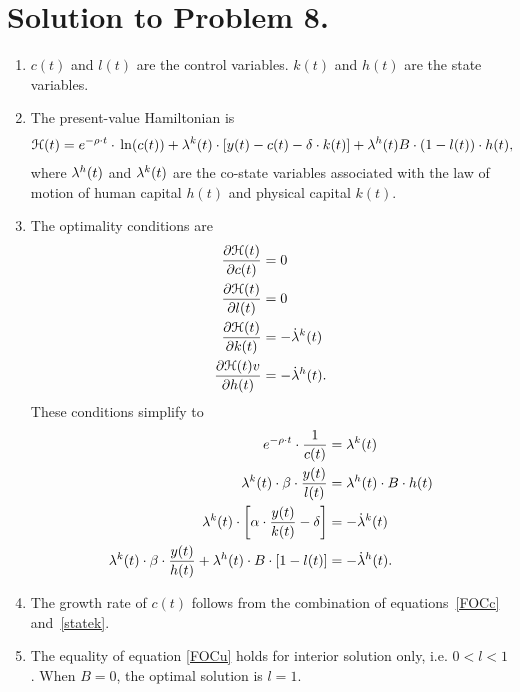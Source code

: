 \documentclass[letterpaper,12pt,leqno]{article}
\begin{document}
\section*{Solution to Problem 8.}
\begin{enumerate}
\item $c(t)$ and $l(t)$ are the control variables. $k(t)$ and $h(t)$ are the state variables.
\item The present-value Hamiltonian is
\begin{align*}
\Hc(t)=e^{-\rho \cdot t}\cdot \ln{c(t)} +\l^{k}(t)\cdot \bs{y(t)-c(t)-\d\cdot  k(t)} +\l^{h}(t) B\cdot \bp{1-l(t)}\cdot  h(t),
\end{align*}
where $\lambda^{h}(t)$ and $\lambda^{k}(t)$ are the co-state variables associated with the law of motion of human capital $h(t)$ and physical capital $k(t)$.

\item The optimality conditions are
\begin{align*}
\frac{\partial \mathcal{H}(t)}{\partial c(t)} &=0\\
\frac{\partial \mathcal{H}(t)}{\partial l(t)}&=0 \\
\frac{\partial \mathcal{H}(t)}{\partial k(t)} &=-\dot{\lambda}^{k}(t)\\
\frac{\partial \mathcal{H}(t)v}{\partial h(t)}&=-\dot{\lambda}^{h}(t).
\end{align*}
These conditions simplify to
\begin{align}
e^{-\rho \cdot t}\cdot \frac{1}{c(t)} &=\lambda^{k}(t) \label{FOCc} \\
\lambda^{k}(t)\cdot \beta \cdot\frac{ y(t)}{l(t)} &=\lambda^{h}(t)\cdot B\cdot h(t)  \label{FOCu} \\
\lambda^{k}(t)\cdot \left[ \alpha\cdot  \frac{y(t)}{k(t)}-\delta \right] &=-\dot{\lambda}^{k}(t)  \label{statek}\\
\lambda^{k}(t)\cdot \beta \cdot\frac{ y(t)}{h(t)}+\lambda^{h}(t)\cdot B\cdot \left[ 1-l(t) \right] &=-\dot{\lambda}^{h}(t)\label{stateh}.
\end{align}
\item The growth rate of $c(t)$ follows from the combination of equations~\eqref{FOCc} and~\eqref{statek}.

\item The equality of equation \eqref{FOCu} holds for
interior solution only, i.e. $0<l<1$. When $B=0$, the optimal solution is $
l=1$.


\end{enumerate}
\end{document}
